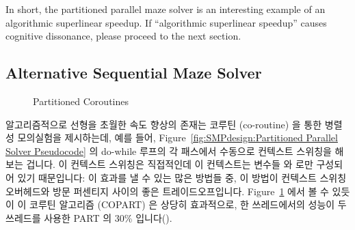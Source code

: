 In short, the partitioned parallel maze solver is an interesting example
of an algorithmic superlinear speedup.
If ``algorithmic superlinear speedup'' causes cognitive dissonance,
please proceed to the next section.
\fi

\subsection{Alternative Sequential Maze Solver}
\label{sec:SMPdesign:Alternative Sequential Maze Solver}

\begin{figure}[tb]
\begin{center}
\end{center}
\caption{Partitioned Coroutines}
\label{fig:SMPdesign:Partitioned Coroutines}
\end{figure}

알고리즘적으로 선형을 초월한 속도 향상의 존재는 코루틴 (co-routine) 을 통한
병렬성 모의실험을 제시하는데, 예를 들어, Figure~\ref{fig:SMPdesign:Partitioned
Parallel Solver Pseudocode} 의 do-while 루프의 각 패스에서 수동으로 컨텍스트
스위칭을 해보는 겁니다.
이 컨텍스트 스위칭은 직접적인데 이 컨텍스트는 변수들  와  로만
구성되어 있기 때문입니다: 이 효과를 낼 수 있는 많은 방법들 중, 이 방법이
컨텍스트 스위칭 오버헤드와 방문 퍼센티지 사이의 좋은 트레이드오프입니다.
Figure~\ref{fig:SMPdesign:Partitioned Coroutines} 에서 볼 수 있듯이 이 코루틴
알고리즘 (COPART) 은 상당히 효과적으로, 한 쓰레드에서의 성능이 두 쓰레드를
사용한 PART 의 30\% 입니다().
\iffalse

